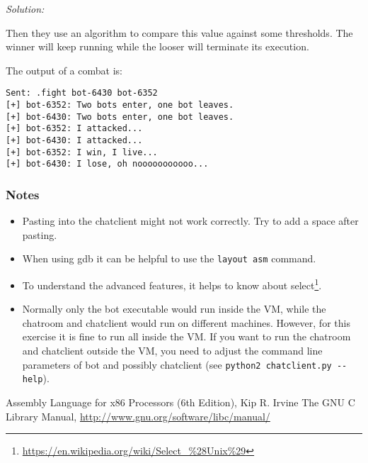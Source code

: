 \documentclass[a4paper,11pt]{article}
\newenvironment{solution}%
{\par{\noindent\small\textit{Solution:}}\vspace{-12pt}\begin{framed}}%
{\end{framed}\par}
\begin{document}
\begin{solution}
Then they use an algorithm to compare this value against some 
thresholds. The winner will keep running while the looser 
will terminate its execution. 

The output of a combat is:
\begin{lstlisting}
Sent: .fight bot-6430 bot-6352
[+] bot-6352: Two bots enter, one bot leaves.
[+] bot-6430: Two bots enter, one bot leaves.
[+] bot-6352: I attacked...
[+] bot-6430: I attacked...
[+] bot-6352: I win, I live...
[+] bot-6430: I lose, oh nooooooooooo...
\end{lstlisting}
 
\end{solution}\fi

\subsubsection*{Notes}
\begin{itemize}
\item Pasting into the chatclient might not work correctly. Try to add a space
after pasting.
\item When using gdb it can be helpful to use the \verb|layout asm| command.
\item To understand the advanced features, it helps to know about
select\footnote{\url{https://en.wikipedia.org/wiki/Select_\%28Unix\%29}}.
\item Normally only the bot executable would run inside the VM, while the
chatroom and chatclient would run on different machines. However, for this
exercise it is fine to run all inside the VM. If you want to run the chatroom
and chatclient outside the VM, you need to adjust the command line parameters of
bot and possibly chatclient (see \verb|python2 chatclient.py --help|).
\end{itemize}



\begin{thebibliography}{---}
 Assembly Language for x86 Processors (6th Edition), Kip R. Irvine 
 The GNU C Library Manual, \url{http://www.gnu.org/software/libc/manual/}
\end{thebibliography}
\end{document}
